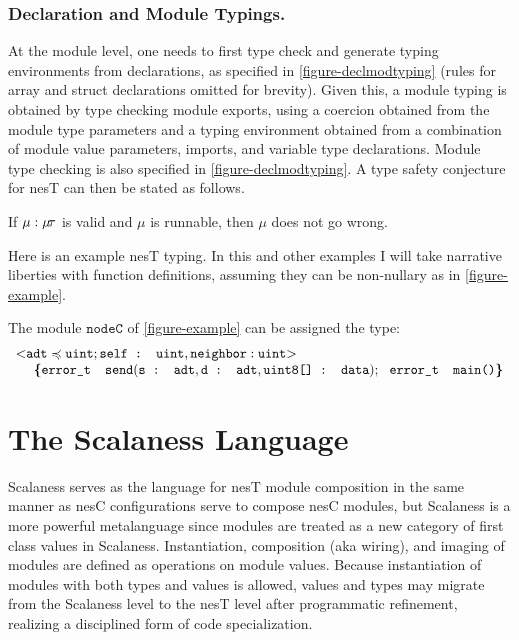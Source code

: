 \subsubsection{Declaration and Module Typings.}
At the module level, one needs to first type check and generate typing environments from
declarations, as specified in \autoref{figure-declmodtyping} (rules for array and struct
declarations omitted for brevity). Given this, a module typing is obtained by type checking
module exports, using a coercion obtained from the module type parameters and a typing
environment obtained from a combination of module value parameters, imports, and variable type
declarations. Module type checking is also specified in \autoref{figure-declmodtyping}. A type
safety conjecture for nesT can then be stated as follows.

\begin{conject}
  If $\mu : \mu\!\tau$ is valid and $\mu$ is runnable, then $\mu$ does not go wrong.
\end{conject}
Here is an example nesT typing. In this and other examples I will take narrative liberties with
function definitions, assuming they can be non-nullary as in \autoref{figure-example}.
\begin{example}
\label{example-nesttyping}
The module $\texttt{nodeC}$ of \autoref{figure-example} can be assigned the type:
$$
\begin{array}{l}
\margs{\tt{adt} \subtype \tt{uint}; \texttt{self : uint}, \tt{neighbor : uint}}\\
\ \ \ \ \lc
\texttt{error\_t\ \ send}(\texttt{s : adt}, \texttt{d : adt}, \texttt{uint8[] : data});\ \ 
\texttt{error\_t\ \  main()} 
\rc
\end{array}
$$
\end{example}


\section{The Scalaness Language}
\label{section-scalaness}

Scalaness serves as the language for nesT module composition in the same manner as nesC
configurations serve to compose nesC modules, but Scalaness is a more powerful metalanguage
since modules are treated as a new category of first class values in Scalaness. Instantiation,
composition (aka wiring), and imaging of modules are defined as operations on module values.
Because instantiation of modules with both types and values is allowed, values and types may
migrate from the Scalaness level to the nesT level after programmatic refinement, realizing a
disciplined form of code specialization.

